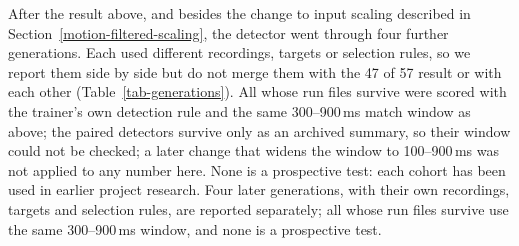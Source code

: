 \fi

\label{later-model-generations}

\iffull
After the result above, and besides the change to input scaling described in Section~\ref{motion-filtered-scaling}, the detector went through four further generations. Each used different recordings, targets or selection rules, so we report them side by side but do not merge them with the 47 of 57 result or with each other (Table~\ref{tab-generations}). All whose run files survive were scored with the trainer's own detection rule and the same 300--900\,ms match window as above; the paired detectors survive only as an archived summary, so their window could not be checked; a later change that widens the window to 100--900\,ms was not applied to any number here. None is a prospective test: each cohort has been used in earlier project research.
\else
Four later generations, with their own recordings, targets and selection rules, are reported separately; all whose run files survive use the same 300--900\,ms window, and none is a prospective test.
\fi

